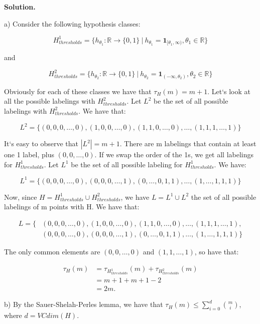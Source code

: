 \documentclass{article}
\newcommand{\<}{\langle}
\renewcommand{\>}{\rangle}
\theoremstyle{definition}
\begin{document}
\textbf{Solution.}

a) Consider the following hypothesis classes:

$$H_{thresholds}^{1} = \{h_{\theta_{1}} : \mathbb{R} \rightarrow \{0,1\} \ | \ h_{\theta_{1}} = \textbf{1}_{[\theta_1, \infty)}, \theta_1 \in \mathbb{R}\}$$

and

$$H_{thresholds}^{2} = \{h_{\theta_{2}} : \mathbb{R} \rightarrow \{0,1\} \ | \ h_{\theta_{2}} = \textbf{1}_{(-\infty, \theta_2)}, \theta_2 \in \mathbb{R}\}$$

Obviously for each of these classes we have that $\tau_H(m) = m + 1$. Let`s look at all the possible labelings with $H_{thresholds}^{2}$. Let $L^2$ be the set of all possible labelings with $H_{thresholds}^{2}$. We have that:

$$L^2 = \{(0, 0, 0, \dots , 0), (1, 0, 0, \dots ,0), (1, 1, 0, \dots, 0), \dots, (1, 1, 1, \dots, 1)\}$$

It`s easy to observe that $|L^2| = m + 1$. There are m labelings that contain at least one 1 label, plus $(0, 0, \dots, 0)$. If we swap the order of the 1s, we get all labelings for $H_{thresholds}^{1}$. Let $L^1$ be the set of all possible labeling for $H_{thresholds}^{1}$. We have:

$$L^1 = \{(0, 0, 0, \dots , 0), (0, 0, 0, \dots , 1), (0, \dots, 0, 1, 1), \dots, (1, \dots, 1, 1, 1)\}$$

Now, since $H = H_{thresholds}^{1} \cup H_{thresholds}^{2}$, we have $L = L^1 \cup L^2$ the set of all possible labelings of m points with H. We have that:

\[
\begin{aligned}
    L = \{& (0, 0, 0, \dots , 0), (1, 0, 0, \dots ,0), (1, 1, 0, \dots, 0), \dots, (1, 1, 1, \dots, 1), \\
    & (0, 0, 0, \dots , 0), (0, 0, 0, \dots , 1), (0, \dots, 0, 1, 1), \dots, (1, \dots, 1, 1, 1)\}
\end{aligned}
\]

The only common elements are $(0, 0, \dots, 0)$ and $(1, 1, \dots, 1)$, so have that:

\[
\begin{aligned}
    \tau_{H}(m) & = \tau_{H_{thresholds}^{1}}(m) + \tau_{H_{thresholds}^{2}}(m) \\
    & = m + 1 + m + 1 - 2 \\
    & = 2m.
\end{aligned}
\]

b) By the Sauer-Shelah-Perles lemma, we have that $\tau_H(m) \leq \sum_{i=0}^{d} {m \choose i}$, where $d = VCdim(H)$.
\end{document}
